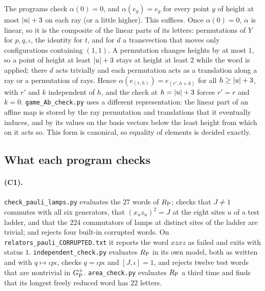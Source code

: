 The programs check $\alpha(0)=0$, and $\alpha(e_y)=e_y$ for every point $y$ of height at most $\lvert u\rvert+3$ on each ray (or a little higher). This suffices. Once
$\alpha(0)=0$, $\alpha$ is linear, so it is the composite of the linear parts of its letters: permutations of $Y$ for $p,q,\iota$, the
identity for $t$, and for $d$ a transvection that moves only configurations containing $(1,1)$. A permutation changes heights by at most
$1$, so a point of height at least $\lvert u\rvert+3$ stays at height at least $2$ while the word is applied; there $d$ acts trivially and each
permutation acts as a translation along a ray or a permutation of rays. Hence $\alpha(e_{(r,h)})=e_{(r',h+k)}$ for all $h\ge\lvert u\rvert+3$,
with $r'$ and $k$ independent of $h$, and the check at $h=\lvert u\rvert+3$ forces $r'=r$ and $k=0$. \texttt{game\_Ab\_check.py} uses a different
representation: the linear part of an affine map is stored by the ray permutation and translations that it eventually induces, and by its
values on the basis vectors below the least height from which on it acts so. This form is canonical, so equality of elements is decided
exactly.

\subsection{What each program checks}\label{cert:what}

\paragraph{(C1).} \texttt{check\_pauli\_lamps.py} evaluates the $27$ words of $R_{\mathrm P}$; checks that $J\ne1$ commutes with all six generators,
that $(x_uz_u)^2=J$ at the eight sites $u$ of a test ladder, and that the $224$ commutators of lamps at distinct sites of the ladder are
trivial; and rejects four built-in corrupted words. On \texttt{relators\_pauli\_CORRUPTED.txt} it reports the word $xzxz$ as failed and
exits with status $1$. \texttt{independent\_check.py} evaluates $R_{\mathrm P}$ in its own model, both as written and with $q\mapsto\iota p\iota$,
checks $q=\iota p\iota$ and $[J,\iota]=1$, and rejects twelve test words that are nontrivial in $G_{\mathrm P}^{+}$. \texttt{area\_check.py} evaluates
$R_{\mathrm P}$ a third time and finds that its longest freely reduced word has $22$ letters.

